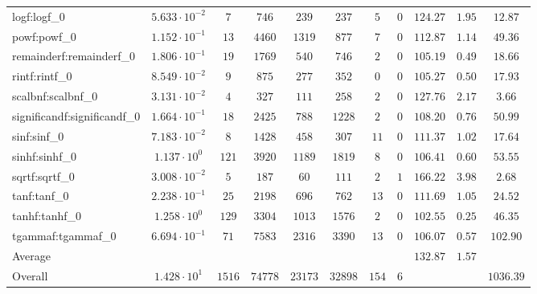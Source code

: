 \begin{tabular}{|l|c|c|c|c|c|c|c|c|c|c|}
logf:logf\_0                 & $ 5.633 \cdot 10^{-2} $ & $ 7      $ & $ 746   $ & $ 239   $ & $ 237   $ & $ 5   $ & $ 0 $ & $ 124.27      $ & $ 1.95    $ & $ 12.87   $ \\
powf:powf\_0                 & $ 1.152 \cdot 10^{-1} $ & $ 13     $ & $ 4460  $ & $ 1319  $ & $ 877   $ & $ 7   $ & $ 0 $ & $ 112.87      $ & $ 1.14    $ & $ 49.36   $ \\
remainderf:remainderf\_0     & $ 1.806 \cdot 10^{-1} $ & $ 19     $ & $ 1769  $ & $ 540   $ & $ 746   $ & $ 2   $ & $ 0 $ & $ 105.19      $ & $ 0.49    $ & $ 18.66   $ \\
rintf:rintf\_0               & $ 8.549 \cdot 10^{-2} $ & $ 9      $ & $ 875   $ & $ 277   $ & $ 352   $ & $ 0   $ & $ 0 $ & $ 105.27      $ & $ 0.50    $ & $ 17.93   $ \\
scalbnf:scalbnf\_0           & $ 3.131 \cdot 10^{-2} $ & $ 4      $ & $ 327   $ & $ 111   $ & $ 258   $ & $ 2   $ & $ 0 $ & $ 127.76      $ & $ 2.17    $ & $ 3.66    $ \\
significandf:significandf\_0 & $ 1.664 \cdot 10^{-1} $ & $ 18     $ & $ 2425  $ & $ 788   $ & $ 1228  $ & $ 2   $ & $ 0 $ & $ 108.20      $ & $ 0.76    $ & $ 50.99   $ \\
sinf:sinf\_0                 & $ 7.183 \cdot 10^{-2} $ & $ 8      $ & $ 1428  $ & $ 458   $ & $ 307   $ & $ 11  $ & $ 0 $ & $ 111.37      $ & $ 1.02    $ & $ 17.64   $ \\
sinhf:sinhf\_0               & $ 1.137 \cdot 10^{0}  $ & $ 121    $ & $ 3920  $ & $ 1189  $ & $ 1819  $ & $ 8   $ & $ 0 $ & $ 106.41      $ & $ 0.60    $ & $ 53.55   $ \\
sqrtf:sqrtf\_0               & $ 3.008 \cdot 10^{-2} $ & $ 5      $ & $ 187   $ & $ 60    $ & $ 111   $ & $ 2   $ & $ 1 $ & $ 166.22      $ & $ 3.98    $ & $ 2.68    $ \\
tanf:tanf\_0                 & $ 2.238 \cdot 10^{-1} $ & $ 25     $ & $ 2198  $ & $ 696   $ & $ 762   $ & $ 13  $ & $ 0 $ & $ 111.69      $ & $ 1.05    $ & $ 24.52   $ \\
tanhf:tanhf\_0               & $ 1.258 \cdot 10^{0}  $ & $ 129    $ & $ 3304  $ & $ 1013  $ & $ 1576  $ & $ 2   $ & $ 0 $ & $ 102.55      $ & $ 0.25    $ & $ 46.35   $ \\
tgammaf:tgammaf\_0           & $ 6.694 \cdot 10^{-1} $ & $ 71     $ & $ 7583  $ & $ 2316  $ & $ 3390  $ & $ 13  $ & $ 0 $ & $ 106.07      $ & $ 0.57    $ & $ 102.90  $ \\
\hline
Average                      & $                     $ & $        $ & $       $ & $       $ & $       $ & $     $ & $   $ & $ 132.87      $ & $ 1.57    $ & $         $ \\
\hline
Overall                      & $ 1.428 \cdot 10^{1}  $ & $ 1516   $ & $ 74778 $ & $ 23173 $ & $ 32898 $ & $ 154 $ & $ 6 $ & $             $ & $         $ & $ 1036.39 $ \\
\hline
\end{tabular}

